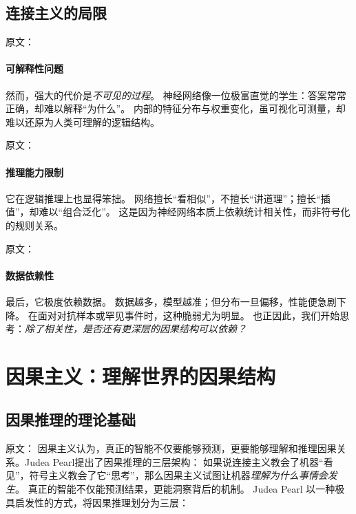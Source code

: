 \subsection{连接主义的局限}

原文：
\paragraph{可解释性问题}
然而，强大的代价是\emph{不可见的过程}。  
神经网络像一位极富直觉的学生：答案常常正确，却难以解释“为什么”。  
内部的特征分布与权重变化，虽可视化可测量，却难以还原为人类可理解的逻辑结构。

原文：
\paragraph{推理能力限制}
它在逻辑推理上也显得笨拙。  
网络擅长“看相似”，不擅长“讲道理”；擅长“插值”，却难以“组合泛化”。  
这是因为神经网络本质上依赖统计相关性，而非符号化的规则关系。

原文：
\paragraph{数据依赖性}
最后，它极度依赖数据。  
数据越多，模型越准；但分布一旦偏移，性能便急剧下降。  
在面对对抗样本或罕见事件时，这种脆弱尤为明显。  
也正因此，我们开始思考：\emph{除了相关性，是否还有更深层的因果结构可以依赖？}

\section{因果主义：理解世界的因果结构}

\subsection{因果推理的理论基础}

原文：
因果主义认为，真正的智能不仅要能够预测，更要能够理解和推理因果关系。Judea Pearl提出了因果推理的三层架构：
如果说连接主义教会了机器“看见”，符号主义教会了它“思考”，那么因果主义试图让机器\emph{理解为什么事情会发生}。  
真正的智能不仅能预测结果，更能洞察背后的机制。  
Judea Pearl 以一种极具启发性的方式，将因果推理划分为三层：

